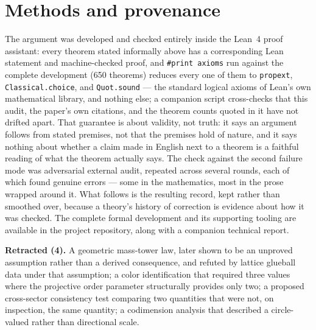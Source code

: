 \documentclass[aps,prd,twocolumn,superscriptaddress,nofootinbib]{revtex4-2}
\begin{document}
\section{Methods and provenance}\label{sec:register}

The argument was developed and checked entirely inside the Lean~4 proof
assistant: every theorem stated informally above has a corresponding
Lean statement and machine-checked proof, and \texttt{\#print axioms}
run against the complete development (650 theorems) reduces every one of
them to \texttt{propext}, \texttt{Classical.choice}, and
\texttt{Quot.sound} — the standard logical axioms of Lean's own
mathematical library, and nothing else; a companion script
cross-checks that this audit, the paper's own citations, and the
theorem counts quoted in it have not drifted apart. That guarantee is
about validity, not truth: it says an argument follows from stated
premises, not that the premises hold of nature, and it says nothing
about whether a claim made in English next to a theorem is a faithful
reading of what the theorem actually says. The check against the second
failure mode was adversarial external audit, repeated across several
rounds, each of which found genuine errors — some in the mathematics,
most in the prose wrapped around it. What follows is the resulting
record, kept rather than smoothed over, because a theory's history of
correction is evidence about how it was checked. The complete formal
development and its supporting tooling are available in the project
repository, along with a companion technical report.

\textbf{Retracted (4).} A geometric mass-tower law, later shown to be an
unproved assumption rather than a derived consequence, and refuted by
lattice glueball data under that assumption; a color identification that
required three values where the projective order parameter structurally
provides only two; a proposed cross-sector consistency test comparing two
quantities that were not, on inspection, the same quantity; a
codimension analysis that described a circle-valued rather than
directional scale.
\end{document}
